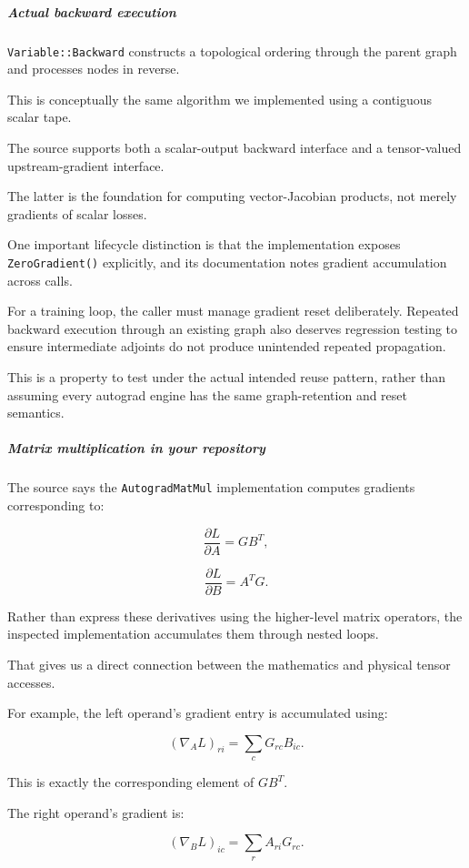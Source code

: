\subparagraph{Actual backward execution}\label{actual-backward-execution}

\texttt{Variable::Backward} constructs a topological ordering through the parent graph and processes nodes in reverse.

This is conceptually the same algorithm we implemented using a contiguous scalar tape.

The source supports both a scalar-output backward interface and a tensor-valued upstream-gradient interface.

The latter is the foundation for computing vector-Jacobian products, not merely gradients of scalar losses.

One important lifecycle distinction is that the implementation exposes \texttt{ZeroGradient()} explicitly, and its documentation notes gradient accumulation across calls.

For a training loop, the caller must manage gradient reset deliberately. Repeated backward execution through an existing graph also deserves regression testing to ensure intermediate adjoints do not produce unintended repeated propagation.

This is a property to test under the actual intended reuse pattern, rather than assuming every autograd engine has the same graph-retention and reset semantics.

\subparagraph{Matrix multiplication in your repository}\label{matrix-multiplication-in-your-repository}

The source says the \texttt{AutogradMatMul} implementation computes gradients corresponding to:

\[
\frac{\partial L}{\partial A}=GB^T,
\]

\[
\frac{\partial L}{\partial B}=A^TG.
\]

Rather than express these derivatives using the higher-level matrix operators, the inspected implementation accumulates them through nested loops.

That gives us a direct connection between the mathematics and physical tensor accesses.

For example, the left operand's gradient entry is accumulated using:

\[
(\nabla_A L)_{ri} = \sum_cG_{rc}B_{ic}.
\]

This is exactly the corresponding element of \(GB^T\).

The right operand's gradient is:

\[
(\nabla_B L)_{ic} = \sum_rA_{ri}G_{rc}.
\]

